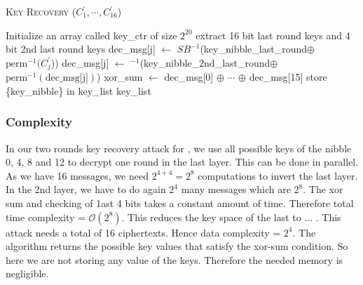 \begin{algorithm*}[htbp]
	\caption{\textsc{Key Recovery} ($C^\prime_1, \cdots, C^\prime_{16}$)}
	\label{alg:key_recovery_2_rounds_present}
	\begin{algorithmic}[1]	
		\State Initialize an array called key\_ctr of size $2^{20}$
		\State extract 16 bit last round keys and 4 bit 2nd last round keys
			
		\State dec\_msg[j] $\gets$ $SB^{-1}$(key\_nibble\_last\_round$\oplus$ $\text{perm}^{-1}(C^\prime_j$))
		\EndFor
			
		\State dec\_msg[j] $\gets$ $^{-1}$(key\_nibble\_2nd\_last\_round$\oplus$ $\text{perm}^{-1}(\text{dec\_msg[j]})$)	
		\EndFor
		\EndFor		
		xor\_sum $\gets$ dec\_msg[0] $\oplus$ $\cdots$ $\oplus$ dec\_msg[15]
			
		\State store \{key\_nibble\} in key\_list
		\EndIf
		\EndFor
		\Return key\_list			
	\end{algorithmic}
\end{algorithm*} 
 

\subsubsection{Complexity}
In our two rounds key recovery attack for \present, we use all possible keys of the nibble 0, 4, 8 and 12 to decrypt one round in the last layer. This can be done in parallel. As we have 16 messages, we need $2^{4+4} = 2^8$ computations to invert the last layer. In the 2nd layer, we have to do again $2^4$ many messages which are $2^8$. The xor sum and checking of 1ast 4 bits takes a constant amount of time. Therefore total time complexity = $\mathcal{O}(2^8)$. This reduces the key space of the last to ... . This attack needs a total of 16 ciphertexts. Hence data complexity = $2^4$. The algorithm returns the possible key values that satisfy the xor-sum condition. So here we are not storing any value of the keys. Therefore the needed memory is negligible. 




